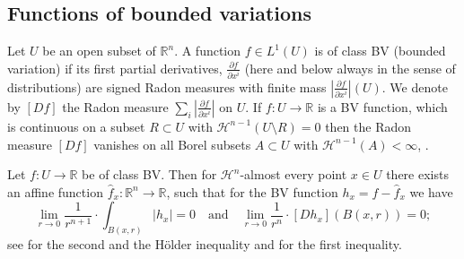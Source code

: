 \documentclass[12pt,leqno,intlimits]{amsart}
\numberwithin{equation}{section}
\theoremstyle{definition}
\theoremstyle{remark}
\newtheorem{rem}[thm]{Remark}
\newcommand{\R}{\mathbb{R}}
\def\co{\colon\thinspace}
\def\:{\colon}
\begin{document}

\subsection{Functions of bounded variations}
Let $U$ be an open subset of $\R^n$. A function $f\in L^1 (U)$ is of class BV (bounded variation) if its first partial derivatives,
$\frac{\partial f}{\partial x^i}$ (here and below always in the sense of distributions) are signed Radon measures with finite mass
$|\frac{\partial f}{\partial x^i}|(U)$. We denote by $[Df ]$ the Radon measure $\sum_i |\frac{\partial f}{\partial x^i}|$ on $U$.
If $f\:U\to \R$ is a BV function, which is continuous on a subset $R \subset U$ with $\mathcal H^{n-1} (U\setminus R)=0$ then the Radon measure $[Df]$ vanishes on all Borel subsets $A\subset U$ with $\mathcal H^{n-1} (A)<\infty$, \cite{Goffmann}.

Let $f\:U\to \R$ be of class BV. Then for $\mathcal H^n$-almost every point
$x\in U$ there exists an affine function $\hat f _x\:\R^n\to \R$, such that for the BV function $h_x=f-\hat f_x$ we have
\begin{equation}\label{DC-ae-diff}
\lim_{r\to 0}\frac 1 {r^{n+1}}\cdot \int _{B(x,r)}|h_x| =0
\quad\text{and}\quad
\lim _{r\to 0} \frac 1 {r^n} \cdot [Dh_x] (B (x,r)) =0;
\end{equation}
see \cite[ Theorem 6.1 (2),(3)]{Evans} for the second and the H\"older inequality and \cite[ Theorem 6.1 (1)]{Evans} for the first inequality.

\end{document}
